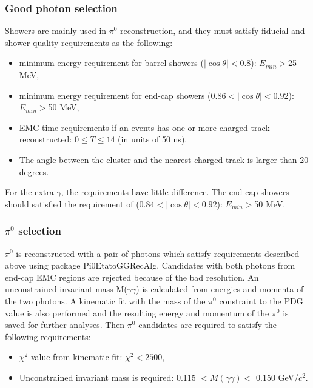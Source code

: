 \documentclass[aps,preprint,tightenlines,superscriptaddress,showpacs,byrevtex,amsmath,amssymb,nofloatfix]{revtex4}
\begin{document}
\subsubsection{Good photon selection}

Showers are mainly used in $\pi^{0}$ reconstruction, and they must satisfy fiducial and shower-quality requirements as the following:
\begin{itemize}
  \item minimum energy requirement for barrel showers ($|\cos\theta|<0.8$): $E_{min}>$25 MeV,
  \item minimum energy requirement for end-cap showers ($0.86<|\cos\theta|<0.92$): $E_{min}>$50 MeV,
  \item EMC time requirements if an events has one or more charged track reconstructed: $0\leq T\leq14$ (in units of 50 ns).
  \item The angle between the cluster and the nearest charged track is larger than 20 degrees.
\end{itemize}
For the extra $\gamma$, the requirements have little difference. The end-cap showers should satisfied the requirement of ($0.84<|\cos\theta|<0.92$): $E_{min}>$50 MeV.

\subsubsection{$\pi^{0}$ selection}
$\pi^{0}$ is reconstructed with a pair of photons which satisfy requirements described above using package Pi0EtatoGGRecAlg. Candidates with both photons from end-cap EMC regions are rejected because of the bad resolution. An unconstrained invariant mass M($\gamma\gamma$) is calculated from energies and momenta of the two photons. A kinematic fit with the mass of the $\pi^{0}$ constraint to the PDG value is also performed and the resulting energy and momentum of the $\pi^{0}$ is saved for further analyses. Then $\pi^{0}$ candidates are required to satisfy the following requirements:
\begin{itemize}
  \item $\chi^{2}$ value from kinematic fit: $\chi^{2}<2500$,
  \item Unconstrained invariant mass is required: 0.115 $< M(\gamma\gamma)<$ 0.150 GeV/$c^{2}$.
\end{itemize}
\end{document}
